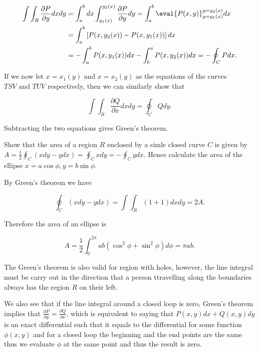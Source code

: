 \documentclass[english,a4paper,12pt]{report}
\begin{document}
\begin{equation}
	\begin{aligned} 
	\int \int_{R}^{} \frac{\partial P}{\partial y} dxdy &= \int_{a}^{b} dx \int_{y_1 (x)}^{y_2 (x)} \frac{\partial P}{\partial y} dy = \int_{a}^{b} \eval{P(x,y)}_{y=y_1 (x)}^{y=y_2 (x)} dx \\
	&= \int_{a}^{b} \left[ P(x,y_2 (x)) - P(x,y_1 (x)) \right] dx \\ 
	&= -\int_{a}^{b} P(x,y_1 (x)) dx - \int_{b}^{a} P(x,y_2 (x)) dx = -\oint_{C} Pdx.      
	\end{aligned}      
\end{equation}

If we now let \(x= x_1 (y) \text { and } x = x_2 (y)\) as the equations of the curves \(TSV \text { and } TUV\) respectively, then we can similarly show that 

\begin{equation}
	\int \int_{R}^{} \frac{\partial Q}{\partial x} dx dy = \oint_{C} Q dy.   
\end{equation}

Subtracting the two equations gives Green's theorem.

{Show that the area of a region \(R\) enclosed by a simle closed curve \(C\) is given by \(A = \frac{1}{2} \oint_{C}(xdy - ydx) = \oint_{C}xdy = - \oint_{C}y dx\). Hence calculate the area of the ellipse \(x = a \cos \phi , y = b\sin \phi \). }
{By Green's theorem we have 

\begin{equation}
	\oint_{C} (xdy- ydx) = \int \int_{R}^{} (1+1) dxdy = 2A.  
\end{equation}

Therefore the area of an ellipse is 

\begin{equation}
	A = \frac{1}{2} \int_{0}^{2\pi } ab(\cos ^2\phi + \sin ^2\phi ) d\phi  = \pi ab.   
\end{equation}
} 

The Green's theorem is also valid for region with holes, however, the line integral must be carry out in the direction that a person ttravelling along the boundaries always has the region \(R\) on their left.

We also see that if the line integral around a closed loop is zero, Green's theorem implies that \(\frac{\partial P}{\partial y} = \frac{\partial Q}{\partial x} \), which is equivalent to saying that \(P(x,y) dx + Q(x,y) dy \) is an exact differential such that it equals to the differential for some function \(\phi (x,y)\) and for a closed loop the beginning and the end points are the same thus we evaluate \(\phi \) at the same point and thus the result is zero.
\end{document}
